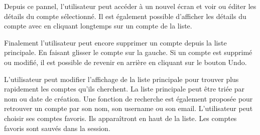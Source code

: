 \begin{center}
	\begin{minipage}{.3\textwidth}
	\end{minipage}
	\begin{minipage}{.3\textwidth}
	\end{minipage}
	\begin{minipage}{.3\textwidth}
	\end{minipage}        
\end{center}

Depuis ce pannel, l'utilisateur peut accéder à un nouvel écran et voir ou éditer les détails du compte sélectionné. Il est également possible d'afficher les détails du compte avec en cliquant longtemps sur un compte de la liste.

\begin{center}
	\begin{minipage}{.3\textwidth}
	\end{minipage}
	\begin{minipage}{.3\textwidth}
	\end{minipage}        
\end{center}

Finalement l'utilisateur peut encore supprimer un compte depuis la liste principale. En faisant glisser le compte sur la gauche. Si un compte est supprimé ou modifié, il est possible de revenir en arrière en cliquant sur le bouton Undo.

\begin{center}
	\begin{minipage}{.3\textwidth}
	\end{minipage}
	\begin{minipage}{.3\textwidth}
	\end{minipage}        
\end{center}

L'utilisateur peut modifier l'affichage de la liste principale pour trouver plus rapidement les comptes qu'ils cherchent. La liste principale peut être triée par nom ou date de création. Une fonction de recherche est également proposée pour retrouver un compte par son nom, son username ou son email. L'utilisateur peut choisir ses comptes favoris. Ils apparaîtront en haut de la liste. Les comptes favoris sont sauvés dans la session.

